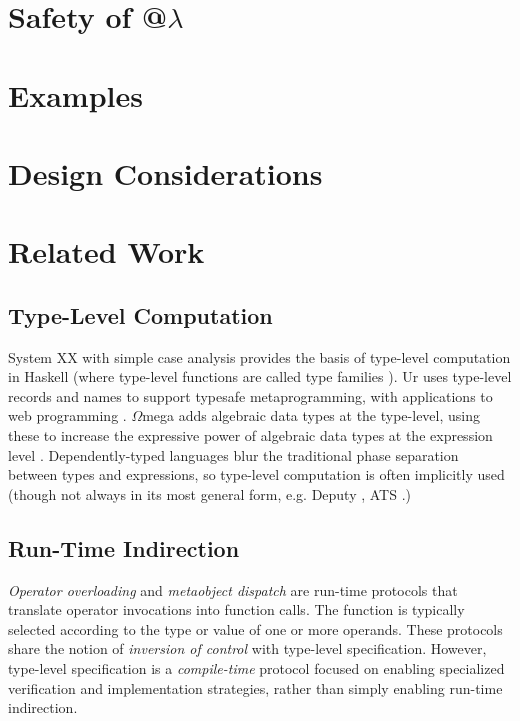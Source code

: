 \documentclass{llncs}
\begin{document}
\section{Safety of @$\lambda$}\label{safety}


\section{Examples}\label{examples}

\section{Design Considerations}\label{design}

\section{Related Work}\label{related-work}
\subsection{Type-Level Computation} %
System XX with simple case analysis provides the basis of type-level computation in Haskell (where type-level functions are called type families \cite{Chakravarty:2005:ATC}). Ur uses type-level records and names to support typesafe metaprogramming, with applications to web programming \cite{conf/pldi/Chlipala10}. $\Omega$mega adds algebraic data types at the type-level, using these to increase the expressive power of algebraic data types at the expression level \cite{conf/cefp/SheardL07}. Dependently-typed languages blur the traditional phase separation between types and expressions, so type-level computation is often implicitly used (though not always in its most general form, e.g. Deputy \cite{conf/icfp/ChenX05}, ATS \cite{conf/esop/ConditHAGN07}.)

\subsection{Run-Time Indirection}
{\it Operator overloading} \cite{vanWijngaarden:Mailloux:Peck:Koster:Sintzoff:Lindsey:Meertens:Fisker:acta:1975} and {\it metaobject dispatch} \cite{Kiczales91} are run-time protocols that translate operator invocations into function calls. The function is typically selected according to the type or value of one or more operands. These protocols share the notion of {\it inversion of control} with type-level specification. However, type-level specification is a {\it compile-time} protocol focused on enabling specialized verification and implementation strategies, rather than simply enabling run-time indirection.
\end{document}
